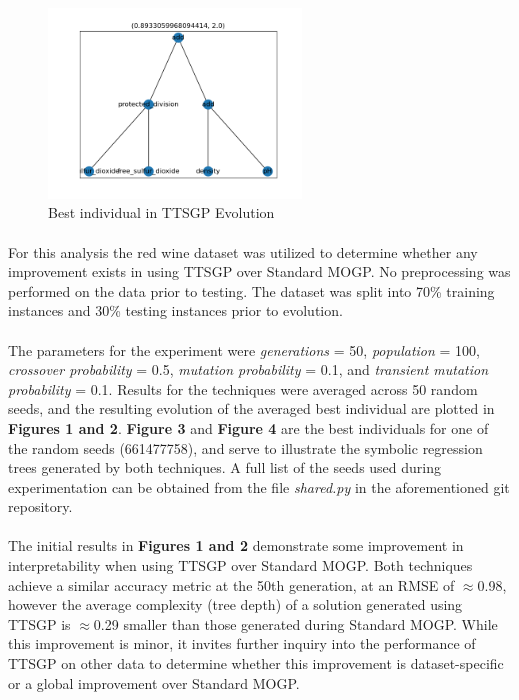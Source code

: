 \documentclass[a4paper]{article}
\begin{document}
\begin{figure}[H]
	\caption{Best individual in TTSGP Evolution}
	\centering
	\includegraphics[width=0.6\textwidth]{Figure_4}
\end{figure}
\paragraph{}For this analysis the red wine dataset was utilized to determine whether any improvement exists in using TTSGP over Standard MOGP. No preprocessing was performed on the data prior to testing. The dataset was split into 70\% training instances and 30\% testing instances prior to evolution.
\paragraph{}The parameters for the experiment were \textit{generations} = 50, \textit{population} = 100, \textit{crossover probability} = 0.5, \textit{mutation probability} = 0.1, and \textit{transient mutation probability} = 0.1. Results for the techniques were averaged across 50 random seeds, and the resulting evolution of the averaged best individual are plotted in \textbf{Figures 1 and 2}. \textbf{Figure 3} and \textbf{Figure 4} are the best individuals for one of the random seeds (661477758), and serve to illustrate the symbolic regression trees generated by both techniques. A full list of the seeds used during experimentation can be obtained from the file \textit{shared.py} in the aforementioned git repository. 
\paragraph{} The initial results in \textbf{Figures 1 and 2} demonstrate some improvement in interpretability when using TTSGP over Standard MOGP. Both techniques achieve a similar accuracy metric at the 50th generation, at an RMSE of $\approx$0.98, however the average complexity (tree depth) of a solution generated using TTSGP is $\approx$0.29 smaller than those generated during Standard MOGP. While this improvement is minor, it invites further inquiry into the performance of TTSGP on other data to determine whether this improvement is dataset-specific or a global improvement over Standard MOGP.
\end{document}
